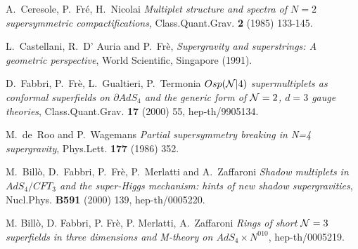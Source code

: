 \documentclass[a4paper,11pt]{article}
\begin{document}
\begin{thebibliography}{99}
A.~Ceresole, P.~Fr\'e, H.~Nicolai {\it Multiplet structure and
spectra of $N=2$ supersymmetric compactifications},
Class.Quant.Grav. {\bf 2} (1985) 133-145.

L.~Castellani, R.~D' Auria and P.~Fr\`e, {\it Supergravity and
superstrings: A geometric perspective}, World Scientific,
Singapore (1991).

D.~Fabbri, P.~Fr\`e, L.~Gualtieri, P.~Termonia {\it $Osp({\cal
N}|4)$ supermultiplets as conformal superfields on $\partial
AdS_4$ and the generic form of ${\cal N}=2$, $d=3$ gauge
theories}, Class.Quant.Grav. {\bf 17} (2000) 55, hep-th/9905134.

M.~de~Roo and P.~Wagemans {\it Partial supersymmetry breaking in
N=4 supergravity}, Phys.Lett. {\bf 177} (1986) 352.

M.~Bill\`o, D.~Fabbri, P.~Fr\`e, P.~Merlatti and A.~Zaffaroni {\it
Shadow multiplets in $AdS_4/CFT_3$ and the super-Higgs mechanism:
hints of new shadow supergravities}, Nucl.Phys. {\bf B591} (2000)
139, hep-th/0005220.

M. Bill\`o, D. Fabbri, P. Fr\`e, P. Merlatti, A.~Zaffaroni {\it
Rings of short ${\cal N}=3$ superfields in three dimensions and
M-theory on $AdS_4\times N^{010}$}, hep-th/0005219.

\end{thebibliography}
\end{document}
